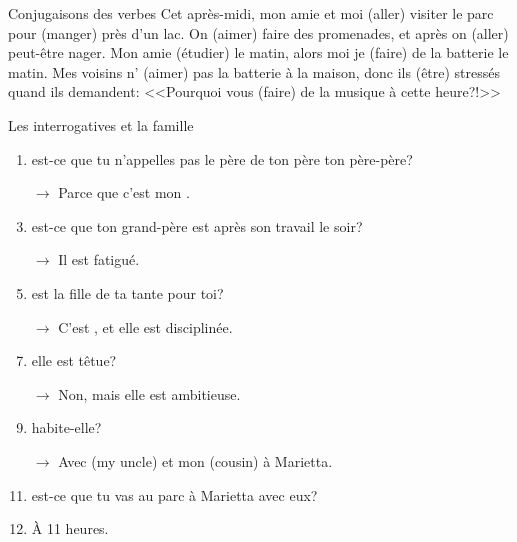 \documentclass{beamer}
\begin{document}
  \begin{frame}{Conjugaisons des verbes }
    Cet après-midi, mon amie et moi \underline{} (aller) visiter le parc pour \underline{} (manger) près d'un lac.
    On \underline{} (aimer) faire des promenades, et après on \underline{} (aller) peut-être nager.
    Mon amie \underline{} (étudier) le matin, alors moi je \underline{} (faire) de la batterie le matin.
    Mes voisins n'\underline{} (aimer) pas la batterie à la maison, donc ils \underline{} (être) stressés quand ils demandent: <<Pourquoi vous \underline{} (faire) de la musique à cette heure?!>>
  \end{frame}

  \begin{frame}{Les interrogatives et la famille }
    \begin{enumerate}
      \item \underline{} est-ce que tu n'appelles pas le père de ton père ton père-père?
      \item[$\to$] Parce que c'est mon \underline{}.
      \item \underline{} est-ce que ton grand-père est après son travail le soir?
      \item[$\to$] Il est fatigué.
      \item \underline{} est la fille de ta tante pour toi?
      \item[$\to$] C'est \underline{}, et elle est disciplinée.
      \item \underline{}elle est têtue?
      \item[$\to$] Non, mais elle est ambitieuse.
      \item \underline{} habite-elle?
      \item[$\to$] Avec \underline{} (my uncle) et mon \underline{} (cousin) à Marietta.
      \item \underline{} est-ce que tu vas au parc à Marietta avec eux?
      \item À 11 heures.
    \end{enumerate}
  \end{frame}
\end{document}
